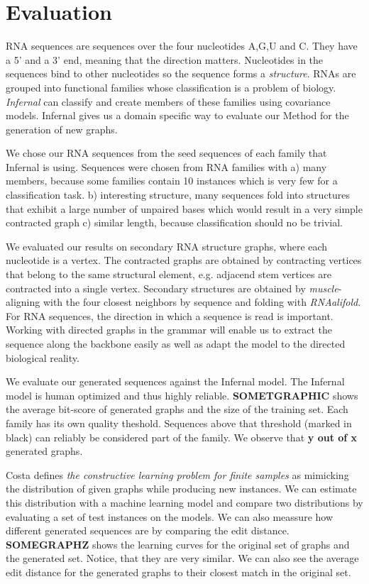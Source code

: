 \documentclass{article}
\begin{document}
\section{Evaluation}
RNA sequences are sequences over the four nucleotides A,G,U and C.
They have a 5' and a 3' end, meaning that the direction matters.
Nucleotides in the sequences bind to other nucleotides so
the sequence forms a \emph{structure}.
RNAs are grouped into functional families whose classification
is a problem of biology. \emph{Infernal} can classify and 
create members of these families using covariance models.
Infernal gives us a domain specific way to evaluate
our Method for the generation of new graphs. 

We chose our RNA sequences from the seed sequences of each family
that Infernal is using. Sequences were chosen from RNA families with
a) many members, because some families contain 10
instances which is very few for a classification task. b) interesting 
structure, many sequences fold into structures that exhibit a large number of 
unpaired bases which would result in a very simple contracted graph
c) similar length, because classification should no be trivial.

We evaluated our results on secondary RNA structure graphs, where each 
nucleotide is a vertex. The contracted graphs are obtained by 
contracting vertices that belong to the same structural element,
e.g. adjacend stem vertices are contracted into a single vertex.
Secondary structures are obtained by \emph{muscle}-aligning with 
the four closest neighbors by sequence and folding with \emph{RNAalifold}.
For RNA sequences, the direction in which a sequence is read is important.
Working with directed graphs in the grammar will enable us to extract the
sequence along the backbone easily as well as adapt the model
to the directed biological reality.

We evaluate our generated sequences against the Infernal model.
The Infernal model is human optimized and thus highly reliable.
 \textbf{SOMETGRAPHIC} shows the average bit-score of generated graphs
and the size of the training set. Each family has its own quality theshold.
Sequences above that threshold (marked in black) can reliably be considered
part of the family. We observe that \textbf{y out of x} generated graphs.

Costa defines \emph{the constructive learning problem for finite samples} 
as mimicking the distribution of given graphs while producing new instances.
We can estimate this distribution with a machine learning
model and compare two distributions by evaluating a set of test instances
on the models. We can also meassure how different generated sequences
are by comparing the edit distance.
\textbf{SOMEGRAPHZ} shows the learning curves for the original set
of graphs and the generated set. Notice, that they are very similar.
We can also see the average edit distance for the generated graphs 
to their closest match in the original set.
\end{document}
